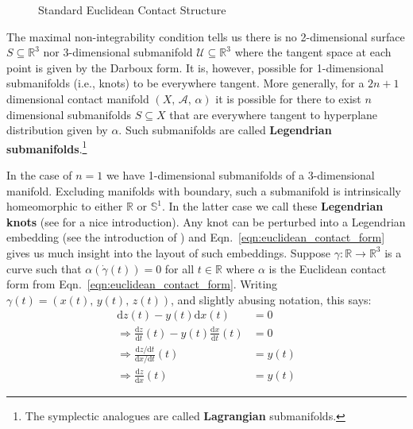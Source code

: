     \begin{figure}
        \centering
        \caption{Standard Euclidean Contact Structure}
        \label{fig:darboux_form_001}
    \end{figure}
    \par\hfill\par
    The maximal non-integrability condition tells us there is no 2-dimensional
    surface $S\subseteq\mathbb{R}^{3}$ nor 3-dimensional submanifold
    $\mathcal{U}\subseteq\mathbb{R}^{3}$ where the tangent space at each point
    is given by the Darboux form. It is, however, possible for 1-dimensional
    submanifolds (i.e., knots) to be everywhere tangent. More generally, for
    a $2n+1$ dimensional contact manifold $(X,\,\mathcal{A},\,\alpha)$ it is
    possible for there to exist $n$ dimensional submanifolds
    $S\subseteq{X}$ that are everywhere tangent to hyperplane distribution
    given by $\alpha$. Such submanifolds
    are called \textbf{Legendrian submanifolds}.\footnote{%
        The symplectic analogues are called \textbf{Lagrangian} submanifolds.
    }
    \par\hfill\par
    In the case of $n=1$ we have 1-dimensional submanifolds of a 3-dimensional
    manifold. Excluding manifolds with boundary, such a submanifold is
    intrinsically homeomorphic to either $\mathbb{R}$ or $\mathbb{S}^{1}$.
    In the latter case we call these \textbf{Legendrian knots}
    (see \cite{JoshuaMSabloffWhatIsLegendrianKnot} for a nice introduction).
    Any knot can be perturbed into a Legendrian embedding
    (see the introduction of \cite{VeraVertessiTransNonSimpleKnots}) and
    Eqn.~\ref{eqn:euclidean_contact_form} gives us much insight into the
    layout of such embeddings. Suppose
    $\gamma:\mathbb{R}\rightarrow\mathbb{R}^{3}$ is a curve such that
    $\alpha(\dot{\gamma}(t))=0$ for all $t\in\mathbb{R}$ where $\alpha$
    is the Euclidean contact form from Eqn.~\ref{eqn:euclidean_contact_form}.
    Writing $\gamma(t)=(x(t),\,y(t),\,z(t))$, and slightly abusing notation,
    this says:
    \begin{subequations}
        \label{eqn:euclidean_legendrian_knot_relations}
        \begin{align}
            \textrm{d}z(t)-y(t)\textrm{d}x(t)
            &=0\\
            \Rightarrow
            \frac{\textrm{d}z}{\textrm{d}t}(t)-
            y(t)\frac{\textrm{d}x}{\textrm{d}t}(t)
            &=0\\
            \Rightarrow
            \frac{\textrm{d}z/\textrm{d}t}{\textrm{d}x/\textrm{d}t}(t)
            &=y(t)\\
            \Rightarrow
            \frac{\textrm{d}z}{\textrm{d}x}(t)
            &=y(t)
        \end{align}
    \end{subequations}

